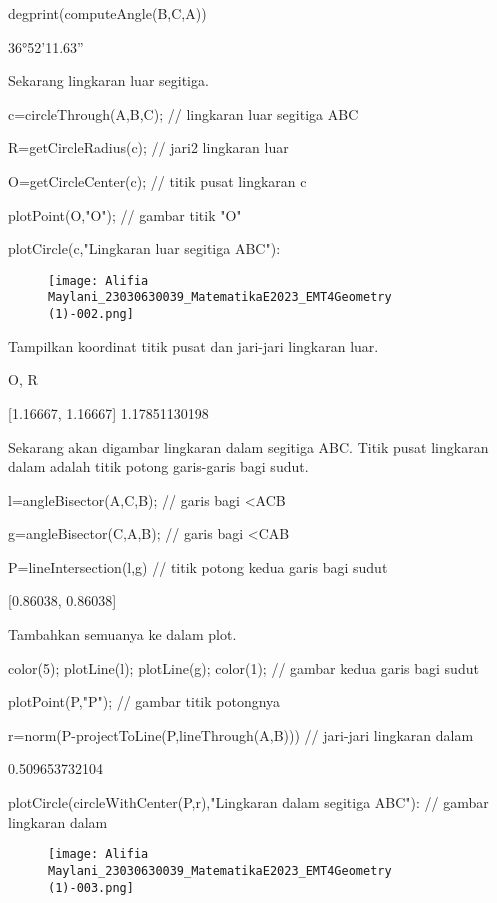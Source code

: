 \documentclass{article}
\begin{document}
\>degprint(computeAngle(B,C,A))


    36°52'11.63''

Sekarang lingkaran luar segitiga.


\>c=circleThrough(A,B,C); // lingkaran luar segitiga ABC

\>R=getCircleRadius(c); // jari2 lingkaran luar 

\>O=getCircleCenter(c); // titik pusat lingkaran c 

\>plotPoint(O,"O"); // gambar titik "O"

\>plotCircle(c,"Lingkaran luar segitiga ABC"):


\begin{figure}
    \centering
    \texttt{[image: Alifia Maylani\_23030630039\_MatematikaE2023\_EMT4Geometry (1)-002.png]}
    \caption{}
    \label{fig:enter-label}
\end{figure}

Tampilkan koordinat titik pusat dan jari-jari lingkaran luar.


\>O, R


    [1.16667,  1.16667]
    1.17851130198

Sekarang akan digambar lingkaran dalam segitiga ABC. Titik pusat lingkaran dalam adalah
titik potong garis-garis bagi sudut.


\>l=angleBisector(A,C,B); // garis bagi <ACB

\>g=angleBisector(C,A,B); // garis bagi <CAB

\>P=lineIntersection(l,g) // titik potong kedua garis bagi sudut


    [0.86038,  0.86038]

Tambahkan semuanya ke dalam plot.


\>color(5); plotLine(l); plotLine(g); color(1); // gambar kedua garis bagi sudut

\>plotPoint(P,"P"); // gambar titik potongnya

\>r=norm(P-projectToLine(P,lineThrough(A,B))) // jari-jari lingkaran dalam


    0.509653732104

\>plotCircle(circleWithCenter(P,r),"Lingkaran dalam segitiga ABC"): // gambar lingkaran dalam


\begin{figure}
    \centering
    \texttt{[image: Alifia Maylani\_23030630039\_MatematikaE2023\_EMT4Geometry (1)-003.png]}
    \caption{}
    \label{fig:enter-label}
\end{figure}
\end{document}
